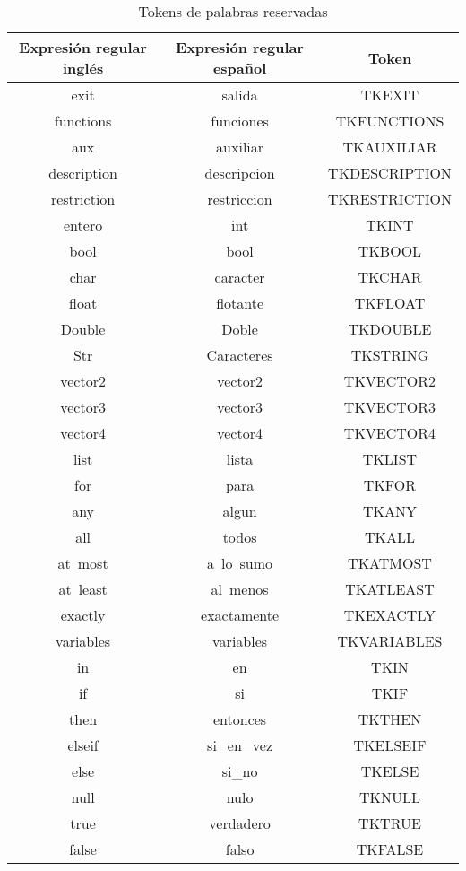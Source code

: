 \begin{table}[h]
\centering
\begin{tabular}{|c|c|c|}
\hline
Expresión regular inglés & Expresión regular español & Token \\
\hline
exit & salida & TKEXIT \\
\hline
functions & funciones & TKFUNCTIONS \\
\hline
aux & auxiliar & TKAUXILIAR \\
\hline
description & descripcion & TKDESCRIPTION \\
\hline
restriction & restriccion & TKRESTRICTION \\
\hline
entero & int    & TKINT \\
\hline
bool  & bool & TKBOOL \\
\hline
char   & caracter & TKCHAR \\
\hline
float  & flotante &  TKFLOAT \\
\hline
Double & Doble  & TKDOUBLE \\
\hline
Str    & Caracteres & TKSTRING \\
\hline
vector2 & vector2 &TKVECTOR2 \\
\hline
vector3 & vector3 &TKVECTOR3 \\
\hline
vector4 & vector4 &TKVECTOR4 \\
\hline
list   & lista  & TKLIST \\
\hline
for    & para   & TKFOR \\
\hline
any    & algun  & TKANY \\
\hline
all    & todos  & TKALL \\
\hline
at\ most & a\ lo\ sumo & TKATMOST \\
\hline
at\ least & al\ menos & TKATLEAST \\
\hline
exactly & exactamente & TKEXACTLY \\
\hline
variables & variables & TKVARIABLES \\
\hline
in     & en     & TKIN \\
\hline
if     & si     & TKIF \\
\hline
then   & entonces & TKTHEN \\
\hline
elseif & si\_en\_vez &  TKELSEIF \\
\hline
else   & si\_no & TKELSE \\
\hline
null   & nulo   & TKNULL \\
\hline
true   & verdadero & TKTRUE \\
\hline
false  & falso  & TKFALSE \\
\hline
\end{tabular}
\caption{Tokens de palabras reservadas}\label{tab:tok_palabras}
\end{table}
